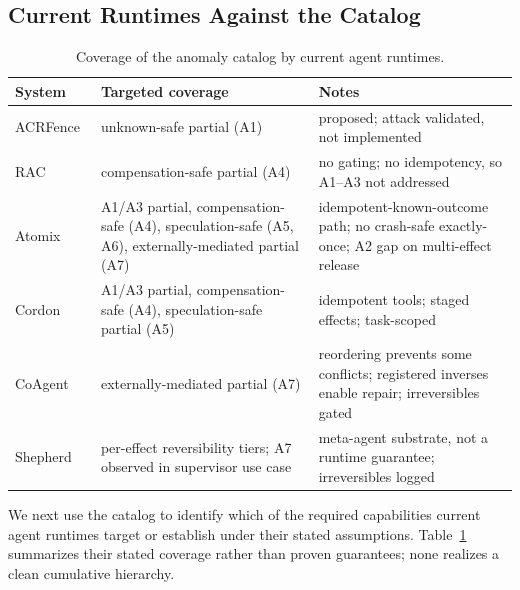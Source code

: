 \documentclass{article}
\begin{document}
\subsection{Current Runtimes Against the Catalog}
\label{sec:systems}

\begin{table}[t]
\centering
\renewcommand{\arraystretch}{1.15}
\small
\caption{Coverage of the anomaly catalog by current agent runtimes.}
\label{tab:systems}
\begin{tabularx}{\linewidth}{@{}l X X@{}}
\toprule
\textbf{System} & \textbf{Targeted coverage} & \textbf{Notes} \\
\midrule
ACRFence~\cite{zheng2026acrfence} & unknown-safe partial (A1) & proposed; attack validated, not implemented \\
RAC~\cite{perera2026rac} & compensation-safe partial (A4) & no gating; no idempotency, so A1--A3 not addressed \\
Atomix~\cite{mohammadi2026atomix} & A1/A3 partial, compensation-safe (A4), speculation-safe (A5, A6), externally-mediated partial (A7) & idempotent-known-outcome path; no crash-safe exactly-once; A2 gap on multi-effect release \\
Cordon~\cite{chen2026cordon} & A1/A3 partial, compensation-safe (A4), speculation-safe partial (A5) & idempotent tools; staged effects; task-scoped \\
CoAgent~\cite{lyu2026coagent} & externally-mediated partial (A7) & reordering prevents some conflicts; registered inverses enable repair; irreversibles gated \\
Shepherd~\cite{yu2026shepherd} & per-effect reversibility tiers; A7 observed in supervisor use case & meta-agent substrate, not a runtime guarantee; irreversibles logged \\
\bottomrule
\end{tabularx}
\renewcommand{\arraystretch}{1}
\end{table}
We next use the catalog to identify which of the required capabilities
current agent runtimes target or establish under their stated assumptions.
Table~\ref{tab:systems} summarizes their
stated coverage rather than proven guarantees; none realizes a clean
cumulative hierarchy.
\end{document}
